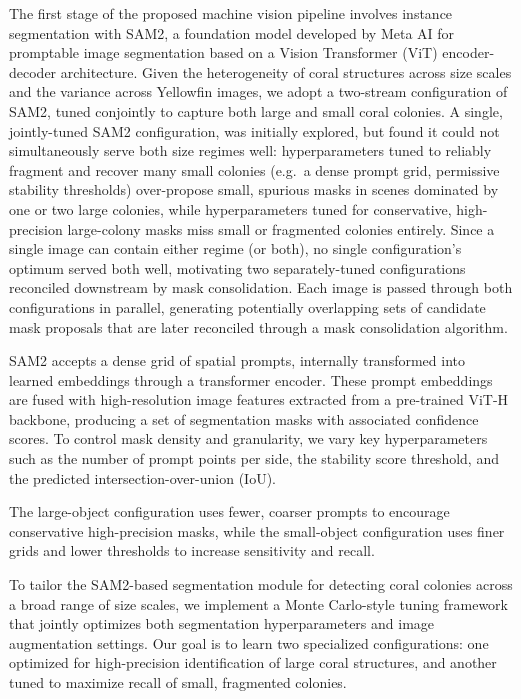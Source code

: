 \documentclass[11pt]{elsarticle}
\begin{document}
The first stage of the proposed machine vision pipeline involves instance segmentation with SAM2, a foundation model developed by Meta AI for promptable image segmentation based on a Vision Transformer (ViT) encoder-decoder architecture. Given the heterogeneity of coral structures across size scales and the variance across Yellowfin images, we adopt a two-stream configuration of SAM2, tuned conjointly to capture both large and small coral colonies. A single, jointly-tuned SAM2 configuration, was initially explored, but found it could not simultaneously serve both size regimes well: hyperparameters tuned to reliably fragment and recover many small colonies (e.g.\ a dense prompt grid, permissive stability thresholds) over-propose small, spurious masks in scenes dominated by one or two large colonies, while hyperparameters tuned for conservative, high-precision large-colony masks miss small or fragmented colonies entirely. Since a single image can contain either regime (or both), no single configuration's optimum served both well, motivating two separately-tuned configurations reconciled downstream by mask consolidation. Each image is passed through both configurations in parallel, generating potentially overlapping sets of candidate mask proposals that are later reconciled through a mask consolidation algorithm.

SAM2 accepts a dense grid of spatial prompts, internally transformed into learned embeddings through a transformer encoder. These prompt embeddings are fused with high-resolution image features extracted from a pre-trained ViT-H backbone, producing a set of segmentation masks with associated confidence scores. To control mask density and granularity, we vary key hyperparameters such as the number of prompt points per side, the stability score threshold, and the predicted intersection-over-union (IoU).

The large-object configuration uses fewer, coarser prompts to encourage conservative high-precision masks, while the small-object configuration uses finer grids and lower thresholds to increase sensitivity and recall.

To tailor the SAM2-based segmentation module for detecting coral colonies across a broad range of size scales, we implement a Monte Carlo-style tuning framework that jointly optimizes both segmentation hyperparameters and image augmentation settings. Our goal is to learn two specialized configurations: one optimized for high-precision identification of large coral structures, and another tuned to maximize recall of small, fragmented colonies.
\end{document}

